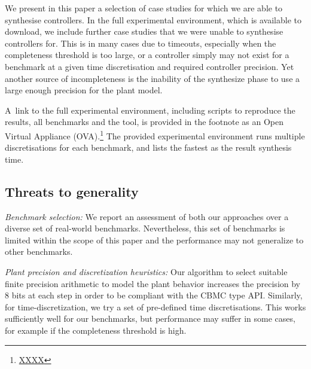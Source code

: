 We present in this paper a selection of case studies for which we are able to synthesise controllers. In the full experimental environment, 
which is available to download, we include further case studies that we were unable to synthesise controllers for. This is in many cases
due to timeouts, especially when the completeness threshold is too large, 
or a controller simply may not exist for a benchmark at a given time discretisation and required controller precision. 
Yet another source of incompleteness is the inability of the {\sc synthesize} phase to use a large enough precision for the plant model. 

A~link to the full experimental environment, including scripts to reproduce the results, all
benchmarks and the tool, is provided in the
footnote as an Open Virtual Appliance (OVA).\footnote{\url{XXXX}}
The provided experimental environment runs multiple discretisations for each
benchmark, and lists the fastest as the result synthesis time.

\subsection{Threats to generality}
\label{exp:threats-to-validity}

\textit{Benchmark selection:} We report an assessment of both our approaches
over a diverse set of real-world benchmarks.  Nevertheless, this set of
benchmarks is limited within the scope of this paper and the performance may
not generalize to other benchmarks.

\textit{Plant precision and discretization heuristics:} Our algorithm to
select suitable finite precision arithmetic to model the plant behavior 
increases the precision by 8 bits at each step 
in order to be compliant with the CBMC type API. 
Similarly, for time-discretization, we try a set of pre-defined time discretisations.
This works sufficiently well for our benchmarks, but
performance may suffer in some cases, for example if the completeness
threshold is high. 



